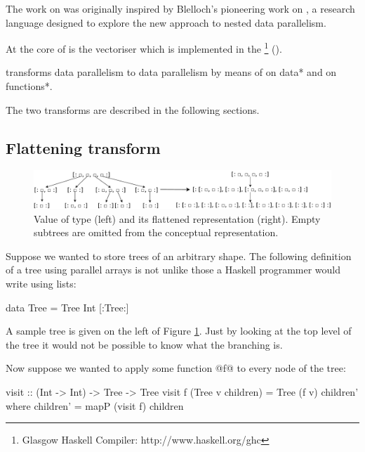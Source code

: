 \documentclass[preamble.tex]{subfiles}
\begin{document}
The work on \DPH was originally inspired by Blelloch's pioneering work on  \cite{BCH+}, a research language designed to explore the new approach to nested data parallelism.

At the core of \DPH is the vectoriser which is implemented in the \footnote{Glasgow Haskell Compiler: http://www.haskell.org/ghc} (\GHC).

\begin{bluebox}
 transforms  data parallelism to  data parallelism by means of  on \*data* and  on \*functions*.
\end{bluebox}

The two transforms are described in the following sections.



\subsection{Flattening transform}
\label{sec:Flattening}


\begin{figure}
\includegraphics[width=1\textwidth]{img/TreeRepr}
\caption{Value of type \code{[:Tree:]} (left) and its flattened representation (right). Empty subtrees are omitted from the conceptual representation.%
\label{fig:TreeRepr}}
\end{figure}


Suppose we wanted to store trees of an arbitrary shape. The following definition of a tree using parallel arrays is not unlike those a Haskell programmer would write using lists:

\begin{hscode}
data Tree = Tree Int [:Tree:]
\end{hscode}

A sample tree is given on the left of Figure \ref{fig:TreeRepr}. Just by looking at the top level of the tree it would not be possible to know what the branching is.

Now suppose we wanted to apply some function @f@ to every node of the tree:


\begin{hscode}
visit :: (Int -> Int) -> Tree -> Tree
visit f (Tree v children) = Tree (f v) children'
  where children' = mapP (visit f) children
\end{hscode}
\end{document}
